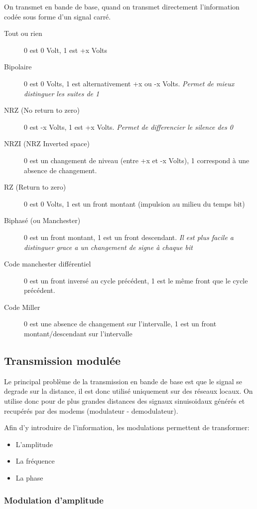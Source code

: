 \documentclass[a4paper, 12pt, french]{article}
\begin{document}
	On transmet en bande de base, quand on transmet directement l'information codée sous forme d'un signal carré.

	\begin{description}
		\item[Tout ou rien] 0 est 0 Volt, 1 est +x Volts
		\item[Bipolaire] 0 est 0 Volts, 1 est alternativement +x ou -x Volts. \emph{Permet de mieux distinguer les suites de 1}
		\item[NRZ (No return to zero)] 0 est -x Volts, 1 est +x Volts. \emph{Permet de differencier le silence des 0}
		\item[NRZI (NRZ Inverted space)] 0 est un changement de niveau (entre +x et -x Volts), 1 correspond à une absence de changement.
		\item[RZ (Return to zero)] 0 est 0 Volts, 1 est un front montant (impulsion au milieu du temps bit)
		\item[Biphasé (ou Manchester)] 0 est un front montant, 1 est un front descendant. \emph{Il est plus facile a distinguer grace a un changement de signe à chaque bit}
		\item[Code manchester différentiel] 0 est un front inversé au cycle précédent, 1 est le même front que le cycle précédent.
		\item[Code Miller] 0 est une absence de changement sur l'intervalle, 1 est un front montant/descendant sur l'intervalle
 	\end{description}

	\subsection{Transmission modulée}

	Le principal problème de la transmission en bande de base est que le signal se degrade sur la distance, il est donc utilisé uniquement sur des réseaux locaux. On utilise donc pour de plus grandes distances des signaux sinuisoidaux générés et recupérés par des modems (modulateur - demodulateur).

	Afin d'y introduire de l'information, les modulations permettent de transformer:
	\begin{itemize}
		\item L'amplitude
		\item La fréquence
		\item La phase
	\end{itemize}

	\subsubsection{Modulation d'amplitude}
\end{document}
